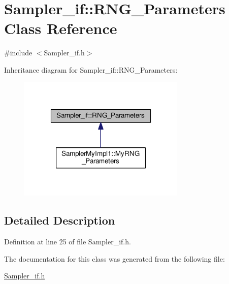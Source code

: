 \hypertarget{class_sampler__if_1_1_r_n_g___parameters}{\section{Sampler\-\_\-if\-:\-:R\-N\-G\-\_\-\-Parameters Class Reference}
\label{class_sampler__if_1_1_r_n_g___parameters}
}


{\ttfamily \#include $<$Sampler\-\_\-if.\-h$>$}



Inheritance diagram for Sampler\-\_\-if\-:\-:R\-N\-G\-\_\-\-Parameters\-:\nopagebreak
\begin{figure}[H]
\begin{center}
\leavevmode
\includegraphics[width=226pt]{class_sampler__if_1_1_r_n_g___parameters__inherit__graph}
\end{center}
\end{figure}


\subsection{Detailed Description}


Definition at line 25 of file Sampler\-\_\-if.\-h.



The documentation for this class was generated from the following file\-:\begin{DoxyCompactItemize}
\item 
\hyperlink{_sampler__if_8h}{Sampler\-\_\-if.\-h}\end{DoxyCompactItemize}
